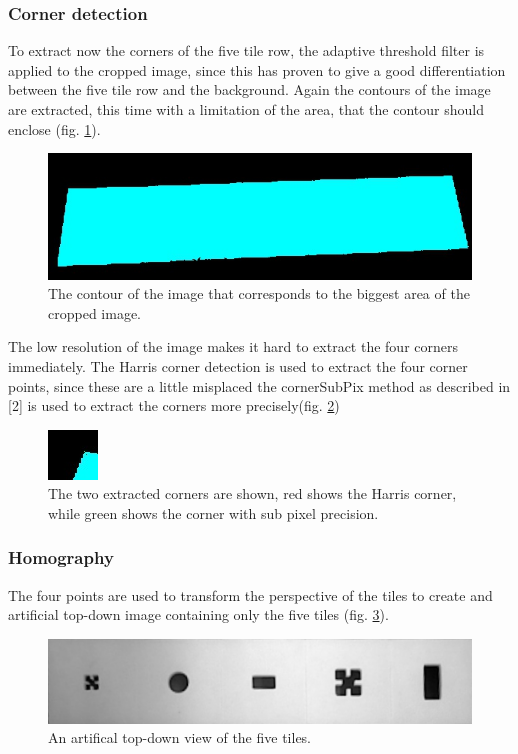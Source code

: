 \documentclass{article}
\begin{document}
\subsubsection*{Corner detection}
To extract now the corners of the five tile row, the adaptive threshold filter is applied to the cropped image, since this has proven to give a good differentiation between the five tile row and the background. Again the contours of the image are extracted, this time with a limitation of the area, that the contour should enclose (fig. \ref{fig:five}). \\
\begin{figure}[h!]
\centering
\includegraphics[scale=0.3]{images/5tiles.jpg}
\caption{The contour of the image that corresponds to the biggest area of the cropped image.}
\label{fig:five}
\end{figure}
The low resolution of the image makes it hard to extract the four corners immediately. The Harris corner detection is used to extract the four corner points, since these are a little misplaced the cornerSubPix method as described in [2] is used to extract the corners more precisely(fig. \ref{fig:points})\\
\begin{figure}[h!]
\centering
\includegraphics[scale=1]{images/Corners.jpg}
\caption{The two extracted corners are shown, red shows the Harris corner, while green shows the corner with sub pixel precision.}
\label{fig:points}
\end{figure}

\subsubsection*{Homography}
The four points are used to transform the perspective of the tiles to create and artificial top-down image containing only the five tiles (fig. \ref{fig:homograph}).\\
\begin{figure}[h!]
\centering
\includegraphics[scale=0.3]{images/homography.jpg}
\caption{An artifical top-down view of the five tiles.}
\label{fig:homograph}
\end{figure}
\end{document}
